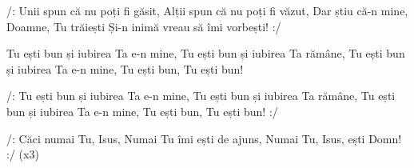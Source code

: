 \beginchorus
/: Unii spun că nu poți fi găsit,
Alții spun că nu poți fi văzut,
Dar știu că-n mine, Doamne, Tu trăiești
Și-n inimă vreau să îmi vorbești! :/
\endchorus

\beginverse
Tu ești bun și iubirea Ta e-n mine,
Tu ești bun și iubirea Ta rămâne,
Tu ești bun și iubirea Ta e-n mine,
Tu ești bun, Tu ești bun!
\endverse

\beginverse
/: Tu ești bun și iubirea Ta e-n mine,
Tu ești bun și iubirea Ta rămâne,
Tu ești bun și iubirea Ta e-n mine,
Tu ești bun, Tu ești bun! :/
\endverse

\beginchorus
/: Căci numai Tu, Isus,
Numai Tu îmi ești de ajuns,
Numai Tu, Isus, ești Domn! :/ (x3)
\endchorus
\endsong